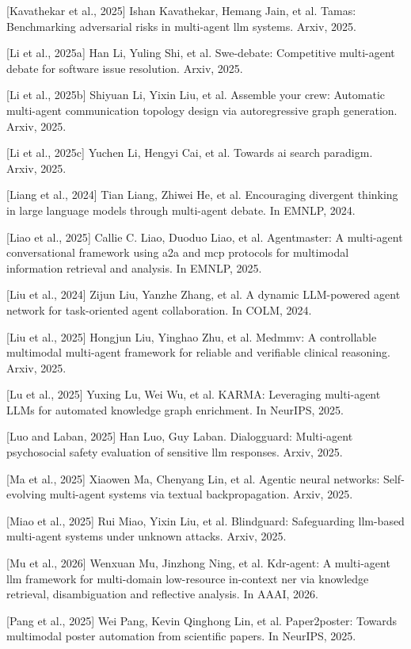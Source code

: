 \documentclass[UTF8,a4paper,12pt]{article}
\begin{document}
{[}Kavathekar et al., 2025{]} Ishan Kavathekar, Hemang Jain, et al. Tamas: Benchmarking adversarial risks in multi-agent llm systems. Arxiv, 2025.

{[}Li et al., 2025a{]} Han Li, Yuling Shi, et al. Swe-debate: Competitive multi-agent debate for software issue resolution. Arxiv, 2025.

{[}Li et al., 2025b{]} Shiyuan Li, Yixin Liu, et al. Assemble your crew: Automatic multi-agent communication topology design via autoregressive graph generation. Arxiv, 2025.

{[}Li et al., 2025c{]} Yuchen Li, Hengyi Cai, et al. Towards ai search paradigm. Arxiv, 2025.

{[}Liang et al., 2024{]} Tian Liang, Zhiwei He, et al. Encouraging divergent thinking in large language models through multi-agent debate. In EMNLP, 2024.

{[}Liao et al., 2025{]} Callie C. Liao, Duoduo Liao, et al. Agentmaster: A multi-agent conversational framework using a2a and mcp protocols for multimodal information retrieval and analysis. In EMNLP, 2025.

{[}Liu et al., 2024{]} Zijun Liu, Yanzhe Zhang, et al. A dynamic LLM-powered agent network for task-oriented agent collaboration. In COLM, 2024.

{[}Liu et al., 2025{]} Hongjun Liu, Yinghao Zhu, et al. Medmmv: A controllable multimodal multi-agent framework for reliable and verifiable clinical reasoning. Arxiv, 2025.

{[}Lu et al., 2025{]} Yuxing Lu, Wei Wu, et al. KARMA: Leveraging multi-agent LLMs for automated knowledge graph enrichment. In NeurIPS, 2025.

{[}Luo and Laban, 2025{]} Han Luo, Guy Laban. Dialogguard: Multi-agent psychosocial safety evaluation of sensitive llm responses. Arxiv, 2025.

{[}Ma et al., 2025{]} Xiaowen Ma, Chenyang Lin, et al. Agentic neural networks: Self-evolving multi-agent systems via textual backpropagation. Arxiv, 2025.

{[}Miao et al., 2025{]} Rui Miao, Yixin Liu, et al. Blindguard: Safeguarding llm-based multi-agent systems under unknown attacks. Arxiv, 2025.

{[}Mu et al., 2026{]} Wenxuan Mu, Jinzhong Ning, et al. Kdr-agent: A multi-agent llm framework for multi-domain low-resource in-context ner via knowledge retrieval, disambiguation and reflective analysis. In AAAI, 2026.

{[}Pang et al., 2025{]} Wei Pang, Kevin Qinghong Lin, et al. Paper2poster: Towards multimodal poster automation from scientific papers. In NeurIPS, 2025.
\end{document}
